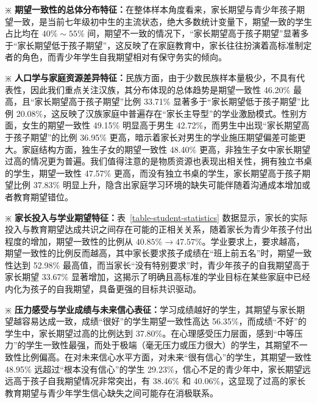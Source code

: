 \documentclass[zihao = -4, linespread = 1.5]{article}
\begin{document}
$\divideontimes$ \textbf{期望一致性的总体分布特征：}在整体样本角度看来，家长期望与青少年孩子期望一致，是当前七年级初中生的主流状态，绝大多数统计变量下，期望一致的学生占比均在 $40\%\sim55\%$ 间，期望不一致的情况下，“家长期望高于孩子期望”显著多于“家长期望低于孩子期望”，这反映了在家庭教育中，家长往往扮演着高标准制定者的角色，而青少年学生自我期望相对有保守务实的倾向。

$\divideontimes$ \textbf{人口学与家庭资源差异特征：}民族方面，由于少数民族样本量极少，不具有代表性，因此我们重点关注汉族，其分布体现的总体趋势是期望一致性 46.20\% 最高，且“家长期望高于孩子期望”比例 33.71\% 显著多于“家长期望低于孩子期望”比例 20.08\%，这反映了汉族家庭中普遍存在“家长主导型”的学业激励模式。性别方面，女生的期望一致性 49.15\% 明显高于男生 42.72\%，而男生中出现“家长期望高于孩子期望”的比例 36.95\% 更高，暗示着家长对男生的学业施压期望偏差可能更大。家庭结构方面，独生子女的期望一致性 48.40\% 更高，非独生子女中家长期望过高的情况更为普遍。我们值得注意的是物质资源也表现出相关性，拥有独立书桌的学生，期望一致性 47.57\% 更高，而没有独立书桌的学生，家长期望高于孩子期望比例 37.83\% 明显上升，隐含出家庭学习环境的缺失可能伴随着沟通成本增加或者教育期望错位。

$\divideontimes$ \textbf{家长投入与学业期望特征：}表~\ref{table-student-statistics} 数据显示，家长的实际投入与教育期望达成共识之间存在可能的正相关关系，随着家长为青少年孩子付出程度的增加，期望一致性的比例从 $40.85\%\to47.57\%$。学业要求上，要求越高，期望一致性的比例反而越高，其中家长要求孩子成绩在“班上前五名”时，期望一致性达到 52.98\% 最高值，而当家长“没有特别要求”时，青少年孩子的自我期望高于家长期望 33.67\% 显著增加，这揭示了明确且高标准的学业目标在某些家庭中已经内化为孩子的自我期望，具备更强的目标共识驱动。

$\divideontimes$ \textbf{压力感受与学业成绩与未来信心表征：}学习成绩越好的学生，其期望与家长期望越容易达成一致，成绩“很好”的学生期望一致性高达 56.35\%，而成绩“不好”的学生中，家长期望过高的比例达到 37.80\%。在心理感受压力层面，感到“中等压力”的学生一致性最强，而处于极端（毫无压力或压力很大）的学生，其期望不一致性比例偏高。在对未来信心水平方面，对未来“很有信心”的学生，其期望一致性 48.95\% 远超过“根本没有信心”的学生 29.23\%，信心不足的青少年中，家长期望远远高于孩子自我期望情况非常突出，有 38.46\% 和 40.06\%，这显现了过高的家长教育期望与青少年学生信心缺失之间可能存在消极联系。
\end{document}
